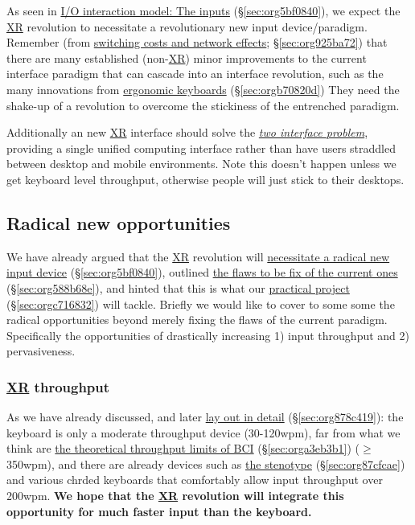 \documentclass[logo,bsc,singlespacing,parskip]{infthesis}
\begin{document}
As seen in \hyperref[sec:org5bf0840]{I/O interaction model: The inputs} (\S \ref{sec:org5bf0840}), we expect the \hyperref[org53dbe83]{XR} revolution to necessitate a revolutionary new input device/paradigm.
Remember (from \hyperref[sec:org925ba72]{switching costs and network effects}; \S \ref{sec:org925ba72}) that there are many established (non-\hyperref[org53dbe83]{XR}) minor improvements to the current interface paradigm that
can cascade into an interface revolution, such as the many innovations from \hyperref[sec:orgb70820d]{ergonomic keyboards} (\S \ref{sec:orgb70820d})
They need the shake-up of a revolution to overcome the stickiness of the entrenched paradigm.

Additionally an new \hyperref[org53dbe83]{XR} interface should solve the \emph{\hyperref[two interface problem]{two interface problem}}, providing a single unified computing interface rather than have users straddled between desktop and mobile environments.
Note this doesn't happen unless we get keyboard level throughput, otherwise people will just stick to their desktops.

\subsection{Radical new opportunities}
\label{sec:org4697c60}
We have already argued that the \hyperref[org53dbe83]{XR} revolution will \hyperref[sec:org5bf0840]{necessitate a radical new input device} (\S \ref{sec:org5bf0840}), outlined \hyperref[sec:org588b68e]{the flaws to be fix of the current ones} (\S \ref{sec:org588b68e}), and hinted that this is what our \hyperref[sec:orgc716832]{practical project} (\S \ref{sec:orgc716832}) will tackle.
Briefly we would like to cover to some some the radical opportunities beyond merely fixing the flaws of the current paradigm.
Specifically the opportunities of drastically increasing 1) input throughput and 2) pervasiveness.

\subsubsection{\hyperref[org53dbe83]{XR} throughput}
\label{sec:orgd1844eb}
As we have already discussed, and later \hyperref[sec:org878c419]{lay out in detail} (\S \ref{sec:org878c419}): the keyboard is only a moderate throughput device (30-120wpm), far from what we think are \hyperref[sec:orga3eb3b1]{the theoretical throughput limits of BCI} (\S \ref{sec:orga3eb3b1}) (\(\ge\)350wpm), and there are already devices such as \hyperref[sec:org87cfcae]{the stenotype} (\S \ref{sec:org87cfcae}) and various chrded keyboards  that comfortably allow input throughput over 200wpm.
\textbf{We hope that the \hyperref[org53dbe83]{XR} revolution will integrate this opportunity for much faster input than the keyboard.}
\end{document}
